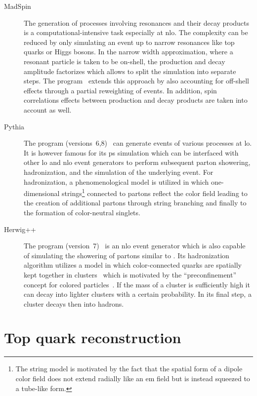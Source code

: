 \begin{description}
\item[MadSpin] The generation of processes involving resonances and their decay products is a computational-intensive task especially at \gls{nlo}. The complexity can be reduced by only simulating an event up to narrow resonances like top quarks or Higgs bosons. In the narrow width approximation, where a resonant particle is taken to be on-shell, the production and decay amplitude factorizes which allows to split the simulation into separate steps. The \MADSPIN[] program~\cite{Artoisenet:2012st} extends this approach by also accounting for off-shell effects through a partial reweighting of events. In addition, spin correlations effects between production and decay products are taken into account as well.

\item[Pythia] The \PYTHIA[] program (versions~6,8)~\cite{Sjostrand:2006za,Sjostrand:2014zea} can generate events of various processes at \gls{lo}. It is however famous for its \gls{ps} simulation which can be interfaced with other \gls{lo} and \gls{nlo} event generators to perform subsequent parton showering, hadronization, and the simulation of the underlying event. For hadronization, a phenomenological model is utilized in which one-dimensional strings\footnote{The string model is motivated by the fact that the spatial form of a dipole color field does not extend radially like an \gls{em} field but is instead squeezed to a tube-like form.} connected to partons reflect the color field leading to the creation of additional partons through string branching and finally to the formation of color-neutral singlets.

\item[Herwig++] The \HERWIG[] program (version~7)~\cite{Bellm:2015jjp} is an \gls{nlo} event generator which is also capable of simulating the showering of partons similar to \PYTHIA. Its hadronization algorithm utilizes a model in which color-connected quarks are spatially kept together in clusters~\cite{Webber:1983if} which is motivated by the ``preconfinement'' concept for colored particles~\cite{Amati:1979fg}. If the mass of a cluster is sufficiently high it can decay into lighter clusters with a certain probability. In its final step, a cluster decays then into hadrons.
\end{description}


\section{Top quark reconstruction}
\label{sec:technique-topreco}

